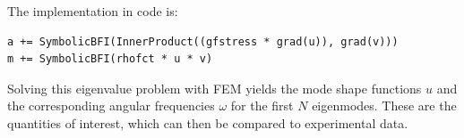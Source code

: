The implementation in code is:
\begin{verbatim}
a += SymbolicBFI(InnerProduct((gfstress * grad(u)), grad(v)))
m += SymbolicBFI(rhofct * u * v)
\end{verbatim}

Solving this eigenvalue problem with FEM yields the mode shape functions $u$ and the corresponding angular frequencies $\omega$ for the first $N$ eigenmodes. These are the quantities of interest, which can then be compared to experimental data.

\newpage